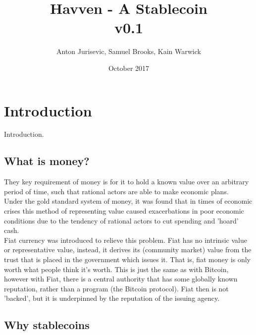 \documentclass{article}
\begin{document}
\newcommand{\CUR}{\textsc{cur}}
\newcommand{\NOM}{\textsc{nom}}


\title{Havven - A Stablecoin \\ v0.1}
\author{Anton Jurisevic, Samuel Brooks, Kain Warwick}
\date{October 2017}


\begin{figure}
    \centering
%    
\end{figure}
\maketitle

\section{Introduction}

Introduction. \\

\subsection{What is money?}

They key requirement of money is for it to hold a known value over an arbitrary period of time, such that rational actors are able to make economic plans. \\

\noindent Under the gold standard system of money, it was found that in times of economic crises this method of representing value caused exacerbations in poor economic conditions due to the tendency of rational actors to cut spending and 'hoard' cash. \\

\noindent Fiat currency was introduced to relieve this problem. Fiat has no intrinsic value or representative value, instead, it derives its (community market) value from the trust that is placed in the government which issues it. That is, fiat money is only worth what people think it's worth. This is just the same as with Bitcoin, however with Fiat, there is a central authority that has some globally known reputation, rather than a program (the Bitcoin protocol). Fiat then is not 'backed', but it is underpinned by the reputation of the issuing agency.

\subsection{Why stablecoins}
\end{document}
